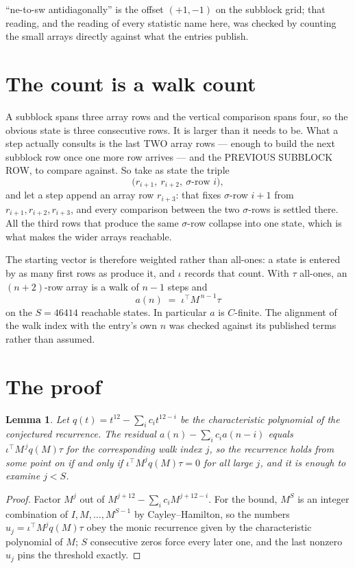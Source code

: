 \documentclass[11pt,a4paper]{article}
\theoremstyle{plain}
\newtheorem{lemma}[theorem]{Lemma}
\theoremstyle{definition}
\begin{document}
``ne-to-sw antidiagonally'' is the offset $(+1,-1)$ on the subblock grid; that reading, and
the reading of every statistic name here, was checked by counting the small arrays directly
against what the entries publish.

\section{The count is a walk count}

A subblock spans three array rows and the vertical comparison spans four, so the obvious state
is three consecutive rows. It is larger than it needs to be. What a step actually consults is
the last TWO array rows --- enough to build the next subblock row once one more row arrives ---
and the PREVIOUS SUBBLOCK ROW, to compare against. So take as state the triple
\[
\bigl(r_{i+1},\ r_{i+2},\ \sigma\text{-row }i\bigr),
\]
and let a step append an array row $r_{i+3}$: that fixes $\sigma$-row $i+1$ from
$r_{i+1},r_{i+2},r_{i+3}$, and every comparison between the two $\sigma$-rows is settled
there. All the third rows that produce the same $\sigma$-row collapse into one state, which is
what makes the wider arrays reachable.

The starting vector is therefore weighted rather than all-ones: a state is entered by as many
first rows as produce it, and $\iota$ records that count. With $\tau$ all-ones, an
$(n+2)$-row array is a walk of $n-1$ steps and
\[
a(n)\;=\;\iota^{\!\top}M^{\,n-1}\tau
\]
on the $S=46414$ reachable states. In particular $a$ is $C$-finite. The alignment of the walk
index with the entry's own $n$ was checked against its published terms rather than assumed.

\section{The proof}

\begin{lemma}\label{lem:crit}
Let $q(t)=t^{12}-\sum_i c_it^{12-i}$ be the characteristic polynomial of the
conjectured recurrence. The residual $a(n)-\sum_ic_ia(n-i)$ equals
$\iota^{\!\top}M^{\,j}q(M)\tau$ for the corresponding walk index $j$, so the recurrence
holds from some point on if and only if $\iota^{\!\top}M^{j}q(M)\tau=0$ for all large $j$,
and it is enough to examine $j<S$.
\end{lemma}

\begin{proof}
Factor $M^{j}$ out of $M^{j+12}-\sum_ic_iM^{j+12-i}$. For the bound, $M^{S}$
is an integer combination of $I,M,\dots,M^{S-1}$ by Cayley--Hamilton, so the numbers
$u_j=\iota^{\!\top}M^{j}q(M)\tau$ obey the monic recurrence given by the characteristic
polynomial of $M$; $S$ consecutive zeros force every later one, and the last nonzero $u_j$
pins the threshold exactly.
\end{proof}
\end{document}
